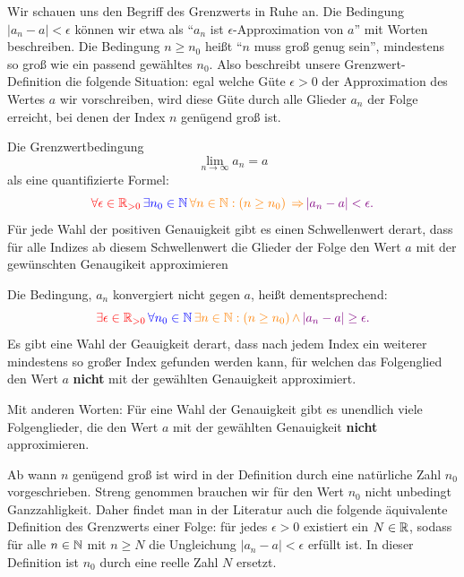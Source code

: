 \begin{bem} 
	Wir schauen uns den Begriff des Grenzwerts in Ruhe an. Die Bedingung $|a_n - a| < \epsilon$ können wir etwa als ``$a_n$ ist $\epsilon$-Approximation von $a$'' mit Worten beschreiben. Die Bedingung $n \ge n_0$ heißt ``$n$ muss groß genug sein'', mindestens so groß wie ein passend gewähltes $n_0$. Also beschreibt unsere Grenzwert-Definition die folgende Situation: egal welche Güte $\epsilon>0$ der Approximation des Wertes $a$ wir vorschreiben, wird diese Güte durch alle Glieder $a_n$ der Folge erreicht, bei denen der Index $n$ genügend groß ist. 
\end{bem} 

\begin{bem} Die Grenzwertbedingung 
\[ \lim_{n \to \infty} a_n = a
\] als eine quantifizierte Formel: 
	\[
			{\color{red} \forall \epsilon  \in \mathbb{R}_{>0} } \, {\color{blue} \exists n_0 \in \mathbb{N} } \, {\color{orange} \forall n \in \mathbb{N} : (n \ge n_0) \, \Rightarrow \,  } {\color{violet} |a_n - a| < \epsilon. }
	\]
	 {\color{red} Für jede Wahl  der positiven Genauigkeit} {\color{blue} gibt es einen Schwellenwert} {\color{orange} derart, dass für alle Indizes ab diesem Schwellenwert}	{\color{violet} die Glieder der Folge den Wert $a$ mit der gewünschten Genaugikeit approximieren}
\end{bem} 

\begin{bem} Die Bedingung, $a_n$ konvergiert nicht gegen $a$, heißt dementsprechend:  
	\[
	{\color{red} \exists \epsilon  \in \mathbb{R}_{>0} } \, {\color{blue} \forall n_0 \in \mathbb{N} } \, {\color{orange} \exists n \in \mathbb{N} : (n \ge n_0) \,  \wedge \,  } {\color{violet} |a_n - a| \ge  \epsilon. }
	\]
	{\color{red} Es gibt eine Wahl der Geauigkeit derart,} {\color{blue} dass nach jedem Index}  {\color{orange} ein weiterer mindestens so großer Index gefunden werden kann,} {\color{violet} für welchen das Folgenglied den Wert $a$ \textbf{nicht} mit der gewählten Genauigkeit approximiert}. 
	
	Mit anderen Worten: Für eine Wahl der Genauigkeit gibt es unendlich viele Folgenglieder, die den Wert $a$ mit der gewählten Genauigkeit \textbf{nicht} approximieren. 
\end{bem} 

\begin{bem}
	Ab wann $n$ genügend groß ist wird in der Definition durch eine natürliche Zahl $n_0$ vorgeschrieben. Streng genommen brauchen wir für den Wert $n_0$ nicht unbedingt Ganzzahligkeit. Daher findet man in der Literatur auch die folgende äquivalente Definition des Grenzwerts einer Folge: für jedes $\epsilon>0$ existiert ein $N \in \mathbb{R}$, sodass für alle $n \in \mathbb{N}$ mit $n \ge N$ die Ungleichung $|a_n - a| < \epsilon$ erfüllt ist. In dieser Definition ist $n_0$ durch eine reelle Zahl $N$ ersetzt.   
\end{bem} 

